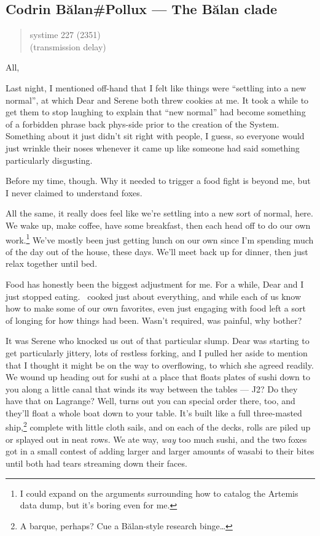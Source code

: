 \hypertarget{codrin-bux103lanpollux-the-bux103lan-clade}{%
\subsection{Codrin Bălan\#Pollux — The Bălan clade}\label{codrin-bux103lanpollux-the-bux103lan-clade}}

\begin{quote}
systime 227 (2351)\\
(transmission delay)
\end{quote}

All,

Last night, I mentioned off-hand that I felt like things were ``settling into a new normal'', at which Dear and Serene both threw cookies at me. It took a while to get them to stop laughing to explain that ``new normal'' had become something of a forbidden phrase back phys-side prior to the creation of the System. Something about it just didn't sit right with people, I guess, so everyone would just wrinkle their noses whenever it came up like someone had said something particularly disgusting.

Before my time, though. Why it needed to trigger a food fight is beyond me, but I never claimed to understand foxes.

All the same, it really does feel like we're settling into a new sort of normal, here. We wake up, make coffee, have some breakfast, then each head off to do our own work.\footnote{I could expand on the arguments surrounding how to catalog the Artemis data dump, but it's boring even for me.} We've mostly been just getting lunch on our own since I'm spending much of the day out of the house, these days. We'll meet back up for dinner, then just relax together until bed.

Food has honestly been the biggest adjustment for me. For a while, Dear and I just stopped eating. \Partner\ cooked just about everything, and while each of us know how to make some of our own favorites, even just engaging with food left a sort of longing for how things had been. Wasn't required, was painful, why bother?

It was Serene who knocked us out of that particular slump. Dear was starting to get particularly jittery, lots of restless forking, and I pulled her aside to mention that I thought it might be on the way to overflowing, to which she agreed readily. We wound up heading out for sushi at a place that floats plates of sushi down to you along a little canal that winds its way between the tables — J2? Do they have that on Lagrange? Well, turns out you can special order there, too, and they'll float a whole boat down to your table. It's built like a full three-masted ship,\footnote{A barque, perhaps? Cue a Bălan-style research binge\ldots{}} complete with little cloth sails, and on each of the decks, rolls are piled up or splayed out in neat rows. We ate way, \emph{way} too much sushi, and the two foxes got in a small contest of adding larger and larger amounts of wasabi to their bites until both had tears streaming down their faces.

